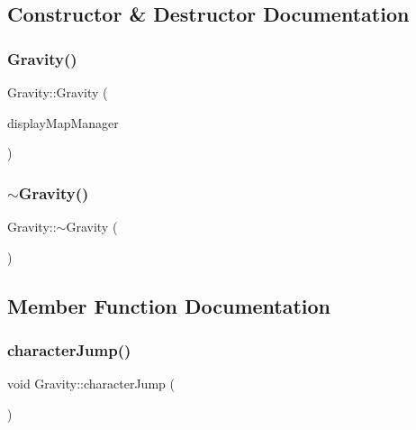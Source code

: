 \subsection{Constructor \& Destructor Documentation}
\mbox{\label{class_gravity_a366c547f2ab1425b5e6981b15a55852d}} 
\subsubsection{\texorpdfstring{Gravity()}{Gravity()}}
{\footnotesize\ttfamily Gravity\+::\+Gravity (\begin{DoxyParamCaption}\item[{\hyperlink{class_display_map_manager}{Display\+Map\+Manager} $\ast$}]{display\+Map\+Manager }\end{DoxyParamCaption})}

\mbox{\label{class_gravity_a6fcaf5f5f0d4672c4a1d97a3102e053a}} 
\subsubsection{\texorpdfstring{$\sim$\+Gravity()}{~Gravity()}}
{\footnotesize\ttfamily Gravity\+::$\sim$\+Gravity (\begin{DoxyParamCaption}{ }\end{DoxyParamCaption})}



\subsection{Member Function Documentation}
\mbox{\label{class_gravity_adb2abc628833f3424ad3ddb93e581290}} 
\subsubsection{\texorpdfstring{character\+Jump()}{characterJump()}}
{\footnotesize\ttfamily void Gravity\+::character\+Jump (\begin{DoxyParamCaption}{ }\end{DoxyParamCaption})}

